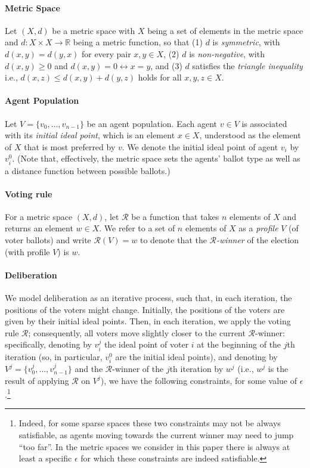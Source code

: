\documentclass[runningheads,envcountsame]{llncs}
\begin{document}
\paragraph{Metric Space}
%
Let $(X, d)$ be a metric space with $X$ being a set of elements in the metric space and $d : X \times X \to \mathbb{R}$ being a metric function, so that (1) $d$ is \textit{symmetric}, with $d(x, y) = d(y, x)$ for every pair $x, y \in X$, (2) $d$ is \textit{non-negative}, with $d(x, y) \geq 0$ and $d(x, y) = 0\leftrightarrow{x=y}$, and (3) $d$ satisfies the \textit{triangle inequality} i.e., $d(x, z) \leq d(x,y)+d(y,z)$ holds for all $x,y,z\in X$. 


\paragraph{Agent Population}
%
Let $V = \{v_0, \ldots, v_{n-1}\}$ be an agent population. Each agent $v \in V$ is associated with its \emph{initial ideal point}, which is an element $x \in X$, understood as the element of $X$ that is most preferred by $v$. We denote the initial ideal point of agent $v_i$ by $v_i^0$.
%
(Note that, effectively, the metric space sets the agents' ballot type as well as a distance function between possible ballots.)


\paragraph{Voting rule}
%
For a metric space $(X, d)$, let $\mathcal{R}$ be a function that takes $n$ elements of $X$ and returns an element $w \in X$. We refer to a set of $n$ elements of $X$ as a \emph{profile} $V$ (of voter ballots) and write $\mathcal{R}(V) = w$ to denote that the \emph{$\mathcal{R}$-winner} of the election (with profile $V$) is $w$.


\paragraph{Deliberation}
%
We model deliberation as an iterative process, such that, in each iteration, the positions of the voters might change. Initially, the positions of the voters are given by their initial ideal points. Then, in each iteration, we apply the voting rule $\mathcal{R}$; consequently, all voters move slightly closer to the current $\mathcal{R}$-winner:
  specifically, denoting by $v_i^j$ the ideal point of voter $i$ at the beginning of the $j$th iteration (so, in particular, $v_i^0$ are the initial ideal points), and denoting by $V^j=\{v_0^j,\ldots,v_{n-1}^j\}$ and the $\mathcal{R}$-winner of the $j$th iteration by $w^j$ (i.e., $w^j$ is the result of applying $\mathcal{R}$ on $V^j$), we have the following constraints, for some value of $\epsilon$.\footnote{Indeed, for some sparse spaces these two constraints may not be always satisfiable, as agents moving towards the current winner may need to jump ``too far''. In the metric spaces we consider in this paper there is always at least a specific $\epsilon$ for which these constraints are indeed satisfiable.}
  
\end{document}
